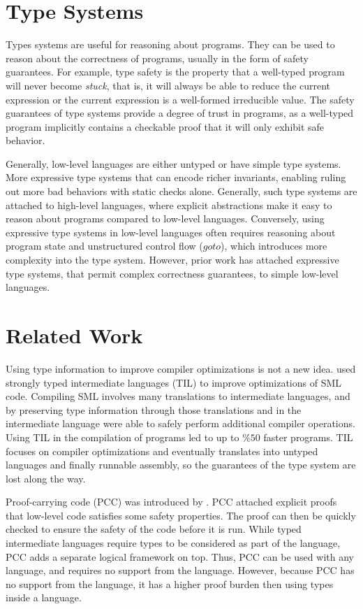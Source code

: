 \section{Type Systems}
Types systems are useful for reasoning about programs.
They can be used to reason about the correctness of programs, usually in the form of safety guarantees.
For example, type safety is the property that a well-typed program will never become \emph{stuck}, that is, it will always be able to reduce the current expression or the current expression is a well-formed irreducible value.
The safety guarantees of type systems provide a degree of trust in programs, as a well-typed program implicitly contains a checkable proof that it will only exhibit safe behavior.

Generally, low-level languages are either untyped or have simple type systems.
More expressive type systems that can encode richer invariants, enabling ruling out more bad behaviors with static checks alone.
Generally, such type systems are attached to high-level languages, where explicit abstractions make it easy to reason about programs compared to low-level languages.
Conversely, using expressive type systems in low-level languages often requires reasoning about program state and unstructured control flow (\ie $goto$), which introduces more complexity into the type system.
However, prior work has attached expressive type systems, that permit complex correctness guarantees, to simple low-level languages.

\section{Related Work}
\label{sec:relwork}
Using type information to improve compiler optimizations is not a new idea.
\citet{TIL} used strongly typed intermediate languages (TIL) to improve optimizations of SML code.
Compiling SML involves many translations to intermediate languages, and by preserving type information through those translations and in the intermediate language \citet{TIL} were able to safely perform additional compiler operations.
Using TIL in the compilation of programs led to up to $\%50$ faster programs.
TIL focuses on compiler optimizations and eventually translates into untyped languages and finally runnable assembly, so the guarantees of the type system are lost along the way.

Proof-carrying code (PCC) was introduced by \citet{PCC}.
PCC attached explicit proofs that low-level code satisfies some safety properties.
The proof can then be quickly checked to ensure the safety of the code before it is run.
While typed intermediate languages require types to be considered as part of the language, PCC adds a separate logical framework on top.
Thus, PCC can be used with any language, and requires no support from the language.
However, because PCC has no support from the language, it has a higher proof burden then using types inside a language.

